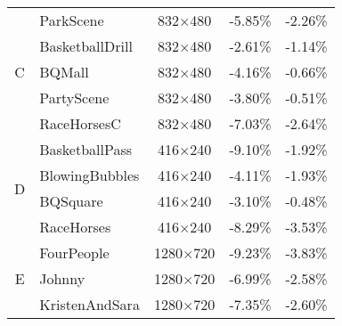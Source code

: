 \begin{table}[!p]
\begin{tabular}{@{}clccc@{}}
        \multirow{5}{*}{C}               & ParkScene                                 & 832$\times$480          & -5.85\%                            & -2.26\%                       \\
                                         & BasketballDrill                           & 832$\times$480          & -2.61\%                            & -1.14\%                       \\
                                         & BQMall                                    & 832$\times$480          & -4.16\%                            & -0.66\%                       \\
                                         & PartyScene                                & 832$\times$480          & -3.80\%                            & -0.51\%                       \\
                                         & RaceHorsesC                               & 832$\times$480          & -7.03\%                            & -2.64\%                       \\
        \multirow{4}{*}{D}               & BasketballPass                            & 416$\times$240          & -9.10\%                            & -1.92\%                       \\
                                         & BlowingBubbles                            & 416$\times$240          & -4.11\%                            & -1.93\%                       \\
                                         & BQSquare                                  & 416$\times$240          & -3.10\%                            & -0.48\%                       \\
                                         & RaceHorses                                & 416$\times$240          & -8.29\%                            & -3.53\%                       \\
        \multirow{6}{*}{E}               & FourPeople                                & 1280$\times$720         & -9.23\%                            & -3.83\%                       \\
                                         & Johnny                                    & 1280$\times$720         & -6.99\%                            & -2.58\%                       \\
                                         & KristenAndSara                            & 1280$\times$720         & -7.35\%                            & -2.60\%                       \\

\end{tabular}
\end{table}
